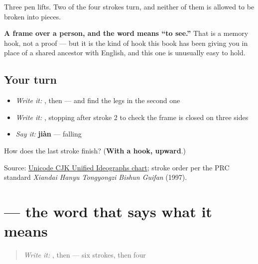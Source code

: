 Three pen lifts. Two of the four strokes turn, and neither of them is allowed to be broken into pieces.

\textbf{A frame over a person, and the word means \textquotedblleft{}to see.\textquotedblright{}} That is a memory hook, not a proof — but it is the kind of hook this book has been giving you in place of a shared ancestor with English, and this one is unusually easy to hold.

\subsection*{Your turn}
\begin{itemize}
\raggedright
  \item \emph{Write it:} , then  — and find the legs in the second one
  \item \emph{Write it:} , stopping after stroke 2 to check the frame is closed on three sides
  \item \emph{Say it:} \textbf{jiàn} — falling
\end{itemize}

\begin{tcolorbox}[breakable,colback=teal!4,colframe=teal!35!black,title={Before you move on}]
How does the last stroke finish? (\textbf{With a hook, upward}.)

Source: \href{https://www.unicode.org/charts/PDF/U4E00.pdf}{Unicode CJK Unified Ideographs chart}; stroke order per the PRC standard \emph{Xiandai Hanyu Tongyongzi Bishun Guifan} (1997).
\end{tcolorbox}
\section[\texorpdfstring{\zh{再见} (zàijiàn)}{再见 (zàijiàn)}]{ — the word that says what it means}

\label{lesson:ZH-C06-zaijian}



\begin{quote}
\emph{Write it:} , then  — six strokes, then four
\end{quote}

